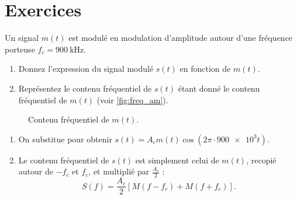 \documentclass [a4paper, 11pt] {article}
\begin{document}
    \pagebreak
    \part*{Exercices}
    
    \begin{exercice}[Modulation AM]{1}
        Un signal $m(t)$ est modulé en modulation d'amplitude autour d'une fréquence porteuse $f_c=\SI{900}{\kilo\hertz}$.
        
        \begin{enumerate}
            \item Donnez l'expression du signal modulé $s(t)$ en fonction de $m(t)$.
            \item Représentez le contenu fréquentiel de $s(t)$ étant donné le contenu fréquentiel de $m(t)$ (voir \autoref{fig:freq_am}).
        \end{enumerate}
        
        \begin{figure}[H]
            \centering
            \caption{Contenu fréquentiel de $m(t)$.}
            \label{fig:freq_am}
        \end{figure}
        
    \end{exercice}
    
    \begin{reponse}
        
        \begin{enumerate}
            \item On substitue pour obtenir $s(t) = A_c m(t) \cos(2\pi \cdot \num{900e3} t)$.
            \item Le contenu fréquentiel de $s(t)$ est simplement celui de $m(t)$, recopié autour de $-f_c$ et $f_c$, et multiplié par $\frac{A_c}{2}$ :
            \begin{equation}
                S(f) = \frac{A_c}{2} \left[M(f-f_c) + M(f+f_c) \right].
            \end{equation}
        \end{enumerate}
        
    \end{reponse}
    
\end{document}
